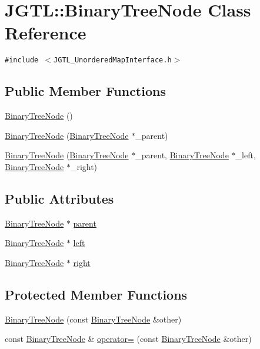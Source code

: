 \hypertarget{class_j_g_t_l_1_1_binary_tree_node}{
\section{JGTL::Binary\-Tree\-Node Class Reference}
\label{class_j_g_t_l_1_1_binary_tree_node}
}
{\tt \#include $<$JGTL\_\-Unordered\-Map\-Interface.h$>$}

\subsection*{Public Member Functions}
\begin{CompactItemize}
\item 
\hyperlink{class_j_g_t_l_1_1_binary_tree_node_4aa523a728d1099d8fc993ef79b228db}{Binary\-Tree\-Node} ()
\item 
\hyperlink{class_j_g_t_l_1_1_binary_tree_node_d27a8918fa259e2f48945571793e3ca3}{Binary\-Tree\-Node} (\hyperlink{class_j_g_t_l_1_1_binary_tree_node}{Binary\-Tree\-Node} $\ast$\_\-parent)
\item 
\hyperlink{class_j_g_t_l_1_1_binary_tree_node_94268eedc62f4bb5d9217a951926f362}{Binary\-Tree\-Node} (\hyperlink{class_j_g_t_l_1_1_binary_tree_node}{Binary\-Tree\-Node} $\ast$\_\-parent, \hyperlink{class_j_g_t_l_1_1_binary_tree_node}{Binary\-Tree\-Node} $\ast$\_\-left, \hyperlink{class_j_g_t_l_1_1_binary_tree_node}{Binary\-Tree\-Node} $\ast$\_\-right)
\end{CompactItemize}
\subsection*{Public Attributes}
\begin{CompactItemize}
\item 
\hyperlink{class_j_g_t_l_1_1_binary_tree_node}{Binary\-Tree\-Node} $\ast$ \hyperlink{class_j_g_t_l_1_1_binary_tree_node_d64ddf204d8ed7fc7d8a39da1fa72312}{parent}
\item 
\hyperlink{class_j_g_t_l_1_1_binary_tree_node}{Binary\-Tree\-Node} $\ast$ \hyperlink{class_j_g_t_l_1_1_binary_tree_node_03864227fd9c612d6a5de7bb6a083fb6}{left}
\item 
\hyperlink{class_j_g_t_l_1_1_binary_tree_node}{Binary\-Tree\-Node} $\ast$ \hyperlink{class_j_g_t_l_1_1_binary_tree_node_d4db6b50b55ba590ea99f5e64f321d37}{right}
\end{CompactItemize}
\subsection*{Protected Member Functions}
\begin{CompactItemize}
\item 
\hyperlink{class_j_g_t_l_1_1_binary_tree_node_c8f227b1540adbb5b58d6e2976934cf4}{Binary\-Tree\-Node} (const \hyperlink{class_j_g_t_l_1_1_binary_tree_node}{Binary\-Tree\-Node} \&other)
\item 
const \hyperlink{class_j_g_t_l_1_1_binary_tree_node}{Binary\-Tree\-Node} \& \hyperlink{class_j_g_t_l_1_1_binary_tree_node_c4f05932006b0bb0c1ace9e449debc5b}{operator=} (const \hyperlink{class_j_g_t_l_1_1_binary_tree_node}{Binary\-Tree\-Node} \&other)
\end{CompactItemize}


